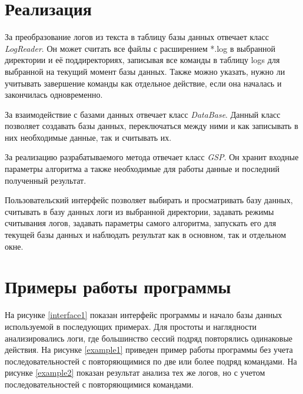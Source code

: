 \section{Реализация}
За преобразование логов из текста в таблицу базы данных отвечает класс \textit{LogReader}.
Он может считать все файлы с расширением *.log в выбранной директории и её поддиректориях, записывая все команды в таблицу logs для выбранной на текущий момент базы данных. Также можно указать, нужно ли учитывать завершение команды как отдельное действие, если она началась и закончилась одновременно.

За взаимодействие с базами данных отвечает класс \textit{DataBase}.
Данный класс позволяет создавать базы данных,
переключаться между ними и как записывать в них необходимые данные, так и считывать их.

За реализацию разрабатываемого метода отвечает
класс \textit{GSP}. %
Он хранит входные параметры алгоритма а также необходимые для работы данные и последний полученный результат.

Пользовательский интерфейс позволяет выбирать и просматривать базу данных, считывать в базу данных логи из выбранной директории, задавать режимы считывания логов, задавать параметры самого алгоритма, запускать его для текущей базы данных и наблюдать результат как в основном, так и отдельном окне.


\section{Примеры работы программы}

На рисунке \ref{interface1} показан интерфейс программы и начало базы данных используемой в последующих примерах.
Для простоты и наглядности анализировались логи, где большинство сессий подряд повторялись одинаковые действия. На рисунке \ref{example1} приведен пример работы программы без учета последовательностей с повторяющимися по две или более подряд командами. На рисунке \ref{example2} показан результат анализа тех же логов, но с учетом последовательностей с повторяющимися командами.

